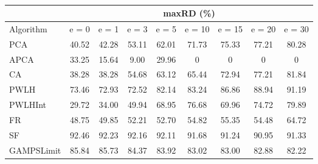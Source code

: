 \begin{table}[h]
\newcommand{\cpca}{\cellcolor{cyan!20}}
\newcommand{\capca}{\cellcolor{green!20}}
\newcommand{\cfr}{\cellcolor{yellow!25}}
\newcommand{\cgzip}{\cellcolor{orange!20}}
\newcommand{\best}{\cellcolor{gray!30}}
\centering\hspace*{0cm}\begin{tabular}{| l | c | c | c | c | c | c | c | c |}\cline{2-9}\multicolumn{1}{c|}{}& \multicolumn{8}{c|}{maxRD (\%)}\\\hline
{Algorithm} & {e = 0} & {e = 1} & {e = 3} & {e = 5} & {e = 10} & {e = 15} & {e = 20} & {e = 30} \\\hline
{PCA\cpca} & {40.52} & {42.28} & {53.11} & {62.01} & {71.73} & {75.33} & {77.21} & {80.28} \\\hline
{APCA\capca} & {33.25} & {\best15.64} & {\best9.00} & {\best29.96} & {\best0} & {\best0} & {\best0} & {\best0} \\\hline
{CA} & {38.28} & {38.28} & {54.68} & {63.12} & {65.44} & {72.94} & {77.21} & {81.84} \\\hline
{PWLH} & {73.46} & {72.93} & {72.52} & {82.14} & {83.24} & {86.86} & {88.94} & {91.19} \\\hline
{PWLHInt} & {\best29.72} & {34.00} & {49.94} & {68.95} & {76.68} & {69.96} & {74.72} & {79.89} \\\hline
{FR\cfr} & {48.75} & {49.85} & {52.21} & {52.70} & {54.82} & {55.35} & {54.48} & {64.72} \\\hline
{SF} & {92.46} & {92.23} & {92.16} & {92.11} & {91.68} & {91.24} & {90.95} & {91.33} \\\hline
{GAMPSLimit} & {85.84} & {85.73} & {84.37} & {83.92} & {83.02} & {83.00} & {82.88} & {82.22} \\\hline
\end{tabular}
\caption{\captionminmax}
\label{experiments:minmax}
\end{table}
